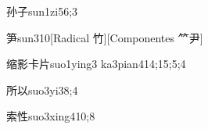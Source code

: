 \begin{verbete}{孙子}{sun1zi5}{6;3}
\end{verbete}

\begin{verbete}{笋}{sun3}{10}[Radical 竹][Componentes ⺮尹]
\end{verbete}

\begin{verbete}{缩影卡片}{suo1ying3 ka3pian4}{14;15;5;4}
\end{verbete}

\begin{verbete}{所以}{suo3yi3}{8;4}
\end{verbete}

\begin{verbete}{索性}{suo3xing4}{10;8}
\end{verbete}

